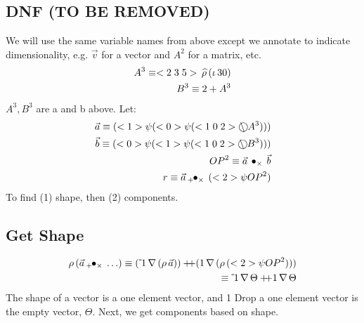 \documentclass[a4paper,12pt]{article}
\begin{document}
\subsection{DNF (TO BE REMOVED)}
We will use the same variable names from above except we annotate to indicate dimensionality, e.g. $\vec v$ for a vector and $A^2$ for a matrix, etc.
\begin{eqnarray}
A^3 \equiv <2\;3\;5>\,\widehat{\rho}\,(\iota\,30) \\
B^3 \equiv 2+A^3
\end{eqnarray}
$A^3,B^3$ are a and b above.
Let:
\begin{eqnarray}
\vec a \equiv (\vc1\psi( \vc0 \psi (\vccc102 \transpose A^3  ))) \\
\vec b \equiv (\vc0\psi( \vc1 \psi (\vccc102 \transpose B^3  )))\\
{OP}^2 \equiv \vec a \outerprod\times\vec b\\
r \equiv \vec a \innerprod+\times(\vc2 \psi {OP}^2)\\
\end{eqnarray}
To find (1) shape, then (2) components.
\subsection{Get Shape}
\begin{eqnarray}
\shape (\vec a \innerprod+\times \ldots ) \equiv (\minus1 \drop (\shape \vec a) )\cat (1 \drop (\shape (\vc2 \psi {OP}^2))) \\ 
\equiv \minus1 \drop \Theta \cat 1 \drop \Theta
\end{eqnarray}
The shape of a vector is a one element vector, and 1 Drop a one element vector is the empty vector, $\Theta$.
Next, we get components based on shape.
\end{document}
